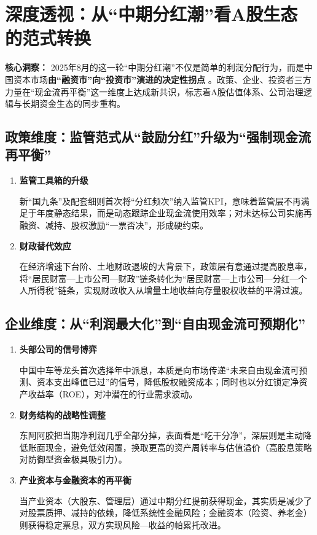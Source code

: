 \section{深度透视：从“中期分红潮”看A股生态的范式转换}

\textbf{核心洞察：}  
2025年8月的这一轮“中期分红潮”不仅是简单的利润分配行为，而是中国资本市场\textbf{由“融资市”向“投资市”演进的决定性拐点} 。政策、企业、投资者三方力量在“现金流再平衡”这一维度上达成新共识，标志着A股估值体系、公司治理逻辑与长期资金生态的同步重构。

\subsection{政策维度：监管范式从“鼓励分红”升级为“强制现金流再平衡”}
\begin{enumerate}[leftmargin=*, nosep]
    \item \textbf{监管工具箱的升级}  
    
    新“国九条”及配套细则首次将“分红频次”纳入监管KPI，意味着监管层不再满足于年度静态结果，而是动态跟踪企业现金流使用效率；对未达标公司实施再融资、减持、股权激励“一票否决”，形成硬约束。
    \item \textbf{财政替代效应}  
    
    在经济增速下台阶、土地财政退坡的大背景下，政策层有意通过提高股息率，将“居民财富—上市公司—财政”链条转化为“居民财富—上市公司—分红—个人所得税”链条，实现财政收入从增量土地收益向存量股权收益的平滑过渡。
\end{enumerate}

\subsection{企业维度：从“利润最大化”到“自由现金流可预期化”}
\begin{enumerate}[leftmargin=*, nosep]
    \item \textbf{头部公司的信号博弈}  
    
    中国中车等龙头首次选择年中派息，本质是向市场传递“未来自由现金流可预测、资本支出峰值已过”的信号，降低股权融资成本；同时也以分红锁定净资产收益率（ROE），对冲潜在的行业需求波动。
    \item \textbf{财务结构的战略性调整}  
    
    东阿阿胶把当期净利润几乎全部分掉，表面看是“吃干分净”，深层则是主动降低账面现金，避免低效闲置，换取更高的资产周转率与估值溢价（高股息策略对防御型资金极具吸引力）。
    \item \textbf{产业资本与金融资本的再平衡}  
    
    当产业资本（大股东、管理层）通过中期分红提前获得现金，其实质是减少了对股票质押、减持的依赖，降低系统性金融风险；金融资本（险资、养老金）则获得稳定票息，双方实现风险—收益的帕累托改进。
\end{enumerate}

